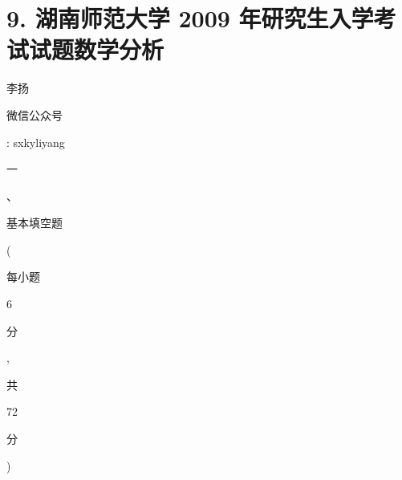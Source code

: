 \documentclass[10pt]{article}
\begin{document}
\section{9. 湖南师范大学 2009 年研究生入学考试试题数学分析}
\begin{CJK}{UTF8}{mj}李扬\end{CJK}

\begin{CJK}{UTF8}{mj}微信公众号\end{CJK}: sxkyliyang

\begin{CJK}{UTF8}{mj}一\end{CJK}、\begin{CJK}{UTF8}{mj}基本填空题\end{CJK}(\begin{CJK}{UTF8}{mj}每小题\end{CJK} 6 \begin{CJK}{UTF8}{mj}分\end{CJK}, \begin{CJK}{UTF8}{mj}共\end{CJK} 72 \begin{CJK}{UTF8}{mj}分\end{CJK})
\end{document}
